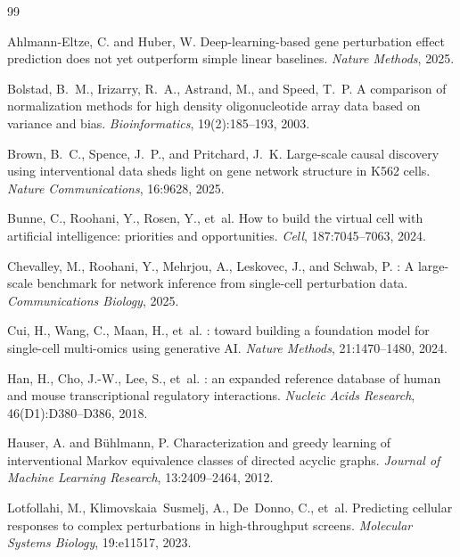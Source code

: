 \documentclass{article}
\theoremstyle{plain}
\theoremstyle{definition}
\theoremstyle{remark}
\begin{document}
\begin{thebibliography}{99}

Ahlmann-Eltze, C. and Huber, W.
\newblock Deep-learning-based gene perturbation effect prediction does not yet outperform simple linear baselines.
\newblock \emph{Nature Methods}, 2025.

Bolstad, B.~M., Irizarry, R.~A., Astrand, M., and Speed, T.~P.
\newblock A comparison of normalization methods for high density oligonucleotide array data based on variance and bias.
\newblock \emph{Bioinformatics}, 19(2):185--193, 2003.

Brown, B.~C., Spence, J.~P., and Pritchard, J.~K.
\newblock Large-scale causal discovery using interventional data sheds light on gene network structure in {K}562 cells.
\newblock \emph{Nature Communications}, 16:9628, 2025.

Bunne, C., Roohani, Y., Rosen, Y., et~al.
\newblock How to build the virtual cell with artificial intelligence: priorities and opportunities.
\newblock \emph{Cell}, 187:7045--7063, 2024.

Chevalley, M., Roohani, Y., Mehrjou, A., Leskovec, J., and Schwab, P.
: A large-scale benchmark for network inference from single-cell perturbation data.
\newblock \emph{Communications Biology}, 2025.

Cui, H., Wang, C., Maan, H., et~al.
: toward building a foundation model for single-cell multi-omics using generative {AI}.
\newblock \emph{Nature Methods}, 21:1470--1480, 2024.

Han, H., Cho, J.-W., Lee, S., et~al.
: an expanded reference database of human and mouse transcriptional regulatory interactions.
\newblock \emph{Nucleic Acids Research}, 46(D1):D380--D386, 2018.

Hauser, A. and B{\"u}hlmann, P.
\newblock Characterization and greedy learning of interventional {Markov} equivalence classes of directed acyclic graphs.
\newblock \emph{Journal of Machine Learning Research}, 13:2409--2464, 2012.

Lotfollahi, M., Klimovskaia~Susmelj, A., De~Donno, C., et~al.
\newblock Predicting cellular responses to complex perturbations in high-throughput screens.
\newblock \emph{Molecular Systems Biology}, 19:e11517, 2023.


\end{thebibliography}
\end{document}
